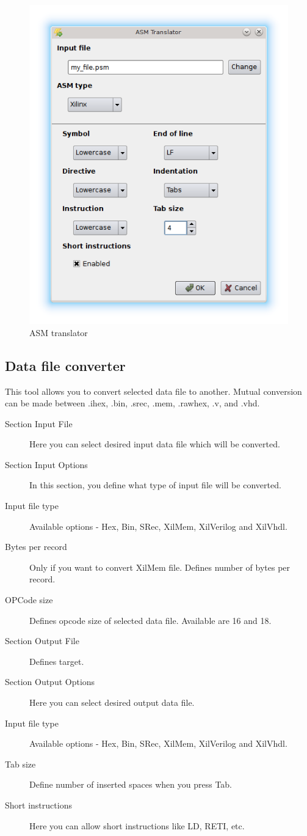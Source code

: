         \begin{figure}[h]
            \centering
            \includegraphics[width=.5\textwidth]{img/ASM_translator.png}
            \caption{ASM translator}
        \end{figure}

    \clearpage
    \subsection{Data file converter}
        This tool allows you to convert selected data file to another. Mutual conversion can be made between .ihex, .bin,
        .srec, .mem, .rawhex, .v, and .vhd.
        \begin{description}
            \item[Section Input File] Here you can select desired input data file which will be converted.
            \item[Section Input Options] In this section, you define what type of input file will be converted.
            \item[Input file type] Available options - Hex, Bin, SRec, XilMem, XilVerilog and XilVhdl.
            \item[Bytes per record] Only if you want to convert XilMem file. Defines number of bytes per record.
            \item[OPCode size] Defines opcode size of selected data file. Available are 16 and 18.
            \item[Section Output File] Defines target.
            \item[Section Output Options] Here you can select desired output data file.
            \item[Input file type] Available options - Hex, Bin, SRec, XilMem, XilVerilog and XilVhdl.
            \item[Tab size]  Define number of inserted spaces when you press Tab.
            \item[Short instructions] Here you can allow short instructions like LD, RETI, etc.
        \end{description}

